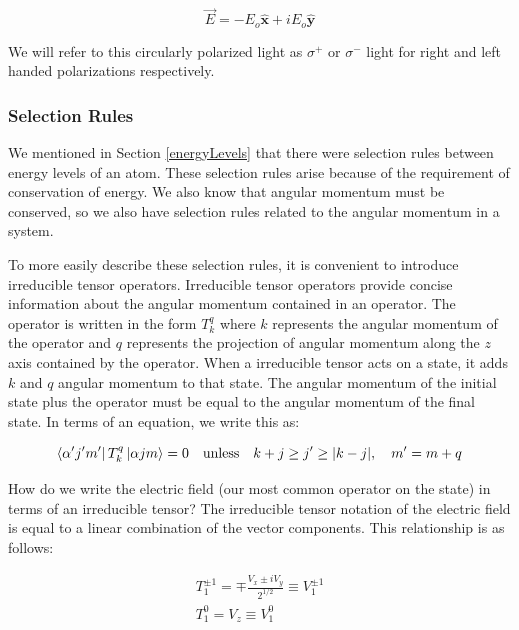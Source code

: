 \documentclass[12pt]{article}
\newcommand{\xhat}{\hat{\textbf{x}}}
\newcommand{\yhat}{\hat{\textbf{y}}}
\begin{document}
		\begin{equation}\label{circleLight}
			\vec{E}=-E_o \xhat  +iE_o \yhat 
		\end{equation}

		We will refer to this circularly polarized light as 
		$\sigma^{+}$ or $\sigma^{-}$ light for right and 
		left handed polarizations respectively.
		
		\subsubsection{Selection Rules}\label{selectionRules}
		We mentioned in Section \ref{energyLevels} that there
		were selection rules between energy levels of an atom.
		These selection rules arise because of the requirement
		of conservation of energy. We also know that angular 
		momentum must be conserved, so we also have selection
		rules related to the angular momentum in a system. 

		To more easily describe these selection rules, it is
		convenient to introduce irreducible tensor operators. 
		Irreducible tensor operators provide concise information
		about the angular momentum contained in an operator.
		The operator is written in the form $T^{q}_{k}$ where
		$k$ represents the angular momentum of the operator
		and $q$ represents the projection of angular momentum
		along the $z$ axis contained by the operator. When a
		irreducible tensor acts on a state, it adds $k$ and 
		$q$ angular momentum to that state. The angular momentum
		of the initial state plus the operator must be
		equal to the angular momentum of the final state. In
		terms of an equation, we write this as: 

		\begin{equation}
			\bra{\alpha'j'm'}T^{q}_{k}\ket{\alpha jm}=0\quad \textrm{unless} \quad k+j\geq j' 
			\geq \vert k-j \vert,\quad m'=m+q
		\end{equation}

		How do we write the electric field (our most common
		operator on the state) in terms of an irreducible 
		tensor? The irreducible tensor notation of the 
		electric field is equal to a linear combination of
		the vector components. This relationship is as 
		follows:

			\begin{gather}
			T^{\pm1}_1 = \mp \frac{V_x \pm iV_y}{2^{1/2}} \equiv V^{\pm1}_{1} 
			\\
			T^{0}_1 = V_z \equiv V^{0}_{1} 
			\end{gather}
\end{document}
